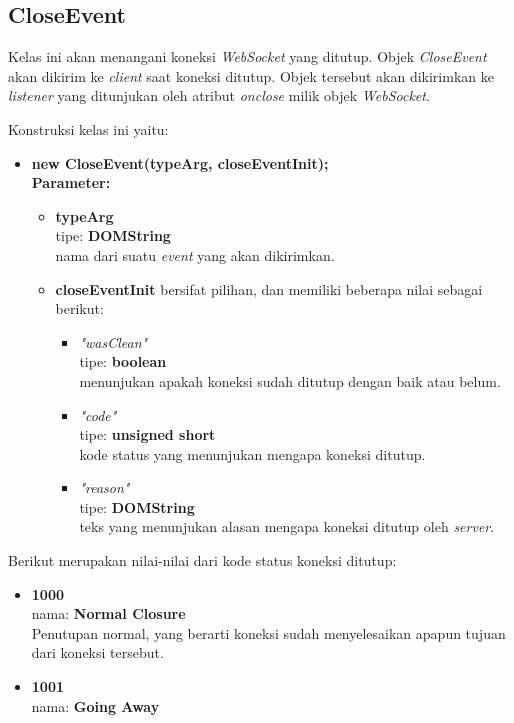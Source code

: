 \subsection{CloseEvent}
Kelas ini akan menangani koneksi \textit{WebSocket} yang ditutup. Objek \textit{CloseEvent} akan dikirim ke \textit{client} saat koneksi ditutup. Objek tersebut akan dikirimkan ke \textit{listener} yang ditunjukan oleh atribut \textit{onclose} milik objek \textit{WebSocket}.

Konstruksi kelas ini yaitu:

\begin{itemize}
	\item \textbf{new CloseEvent(typeArg, closeEventInit);} \\ \textbf{Parameter:} 
		\begin{itemize}
			\item \textbf{typeArg} \\ tipe: \textbf{DOMString} \\ nama dari suatu \textit{event} yang akan dikirimkan.
			\item \textbf{closeEventInit} bersifat pilihan, dan memiliki beberapa nilai sebagai berikut:
				\begin{itemize}
					\item \textit{"wasClean"} \\ tipe: \textbf{boolean} \\ menunjukan apakah koneksi sudah ditutup dengan baik atau belum.
					\item \textit{"code"} \\ tipe: \textbf{unsigned short} \\ kode status yang menunjukan mengapa koneksi ditutup.
					\item \textit{"reason"} \\ tipe: \textbf{DOMString} \\ teks yang menunjukan alasan mengapa koneksi ditutup oleh \textit{server}.
				\end{itemize}
		\end{itemize}
\end{itemize}

Berikut merupakan nilai-nilai dari kode status koneksi ditutup:

\begin{itemize}
	\item \textbf{1000} \\ nama: \textbf{Normal Closure} \\ Penutupan normal, yang berarti koneksi sudah menyelesaikan apapun tujuan dari koneksi tersebut.
	\item \textbf{1001} \\ nama: \textbf{Going Away} \\ 
\end{itemize}


